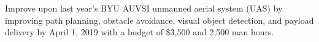 
\begin{artifacttable}
\end{artifacttable}

Improve upon last year's BYU AUVSI unmanned aerial system (UAS) by improving path planning,
obstacle avoidance, visual object detection, and payload delivery by April 1, 2019 with a budget
of \$3,500 and 2,500 man hours.
